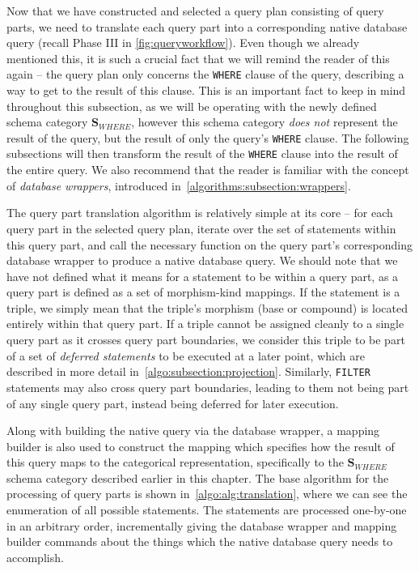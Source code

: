 Now that we have constructed and selected a query plan consisting of query parts, we need to translate each query part into a corresponding native database query (recall Phase III in \cref{fig:queryworkflow}).
Even though we already mentioned this, it is such a crucial fact that we will remind the reader of this again -- the query plan only concerns the \texttt{WHERE} clause of the query, describing a way to get to the result of this clause.
This is an important fact to keep in mind throughout this subsection, as we will be operating with the newly defined schema category $\mathbf{S}_{WHERE}$, however this schema category \textit{does not} represent the result of the query, but the result of only the query's \texttt{WHERE} clause.
The following subsections will then transform the result of the \texttt{WHERE} clause into the result of the entire query.
We also recommend that the reader is familiar with the concept of \textit{database wrappers}, introduced in~\cref{algorithms:subsection:wrappers}.

The query part translation algorithm is relatively simple at its core -- for each query part in the selected query plan, iterate over the set of statements within this query part, and call the necessary function on the query part's corresponding database wrapper to produce a native database query.
We should note that we have not defined what it means for a statement to be within a query part, as a query part is defined as a set of morphism-kind mappings.
If the statement is a triple, we simply mean that the triple's morphism (base or compound) is located entirely within that query part.
If a triple cannot be assigned cleanly to a single query part as it crosses query part boundaries, we consider this triple to be part of a set of \textit{deferred statements} to be executed at a later point, which are described in more detail in~\cref{algo:subsection:projection}.
Similarly, \texttt{FILTER} statements may also cross query part boundaries, leading to them not being part of any single query part, instead being deferred for later execution.

Along with building the native query via the database wrapper, a mapping builder is also used to construct the mapping which specifies how the result of this query maps to the categorical representation, specifically to the $\mathbf{S}_{WHERE}$ schema category described earlier in this chapter.
The base algorithm for the processing of query parts is shown in~\cref{algo:alg:translation}, where we can see the enumeration of all possible statements.
The statements are processed one-by-one in an arbitrary order, incrementally giving the database wrapper and mapping builder commands about the things which the native database query needs to accomplish.

